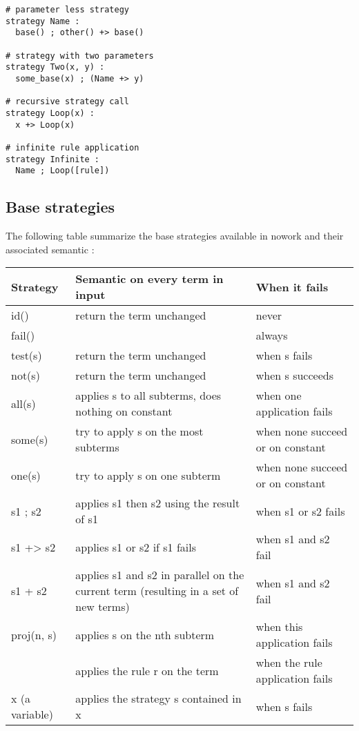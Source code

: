 \documentclass[12pt,a4paper]{article}
\begin{document}
\begin{verbatim}
# parameter less strategy
strategy Name : 
  base() ; other() +> base()

# strategy with two parameters
strategy Two(x, y) :
  some_base(x) ; (Name +> y)

# recursive strategy call
strategy Loop(x) :
  x +> Loop(x)

# infinite rule application
strategy Infinite :
  Name ; Loop([rule])
\end{verbatim}

\subsection{Base strategies}
The following table summarize the base strategies available in nowork and their
associated semantic :\\

\begin{center}
    \begin{tabular}{ | l | p{6cm} | p{4cm} |}
    \hline
    Strategy & Semantic on every term in input & When it fails \\ \hline
    id() & return the term unchanged & never \\ \hline
    fail() & & always \\ \hline
    test(s) & return the term unchanged & when s fails \\ \hline
    not(s) & return the term unchanged & when s succeeds \\ \hline
    all(s) & applies s to all subterms, does nothing on constant & when one 
    application fails \\ \hline
    some(s) & try to apply s on the most subterms & when none succeed or on constant 
    \\ \hline
    one(s) & try to apply s on one subterm & when none succeed or on constant 
    \\ \hline
    s1 ; s2 & applies s1 then s2 using the result of s1 & when s1 or s2 fails 
    \\ \hline
    s1 +> s2 & applies s1 or s2 if s1 fails & when s1 and s2 fail \\ \hline
    s1 + s2 & applies s1 and s2 in parallel on the current term 
      (resulting in a set of new terms) & when s1 and s2 fail \\ \hline 
    proj(n, s) & applies s on the nth subterm &
      when this application fails \\ \hline
    [r] & applies the rule r on the term & when the rule application fails \\ \hline
    x (a variable) & applies the strategy s contained in x & when s fails \\ \hline
    \end{tabular}
\end{center}
\end{document}
